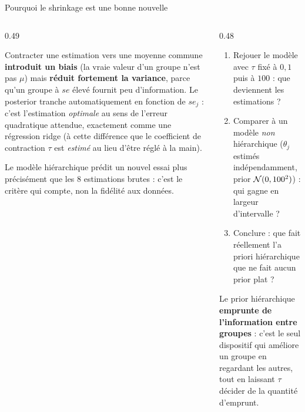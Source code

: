 \begin{frame}{Pourquoi le shrinkage est une bonne nouvelle}
\small
\begin{columns}[t]
\begin{column}{0.49\textwidth}
\begin{kbox}
Contracter une estimation vers une moyenne commune \textbf{introduit un biais}
(la vraie valeur d'un groupe n'est pas $\mu$) mais \textbf{réduit fortement la
variance}, parce qu'un groupe à $se$ élevé fournit peu d'information.
Le posterior tranche automatiquement en fonction de $se_j$ : c'est l'estimation
\emph{optimale} au sens de l'erreur quadratique attendue, exactement comme une
régression ridge (à cette différence que le coefficient de contraction $\tau$
est \emph{estimé} au lieu d'être réglé à la main).
\end{kbox}
\begin{ebox}
Le modèle hiérarchique prédit un nouvel essai plus précisément que les
$8$ estimations brutes : c'est le critère qui compte, non la fidélité aux données.
\end{ebox}
\vspace{-3mm}
\end{column}
\begin{column}{0.48\textwidth}
\begin{abox}
\begin{enumerate}
  \item Rejouer le modèle avec $\tau$ fixé à $0{,}1$ puis à $100$ : que
        deviennent les estimations ?
  \item Comparer à un modèle \emph{non} hiérarchique ($\theta_j$ estimés
        indépendamment, prior $\mathcal{N}(0,100^2)$) : qui gagne en largeur d'intervalle ?
  \item Conclure : que fait réellement l'a priori hiérarchique que ne fait
        aucun prior plat ?
\end{enumerate}
\end{abox}
\begin{solbox}
Le prior hiérarchique \textbf{emprunte de l'information entre groupes} : c'est le
seul dispositif qui améliore un groupe en regardant les autres, tout en laissant
$\tau$ décider de la quantité d'emprunt.
\end{solbox}
\end{column}
\end{columns}
\end{frame}

